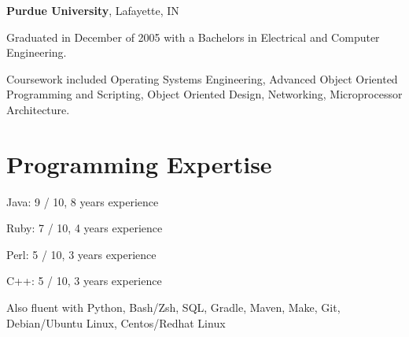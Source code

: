 \documentclass[margin,line]{resume}
\begin{document}
\begin{resume}
	{\bf Purdue University}, Lafayette, IN \vspace{2mm}
	\begin{list2}
		\vspace*{1mm}
	\item
		Graduated in December of 2005 with a Bachelors in Electrical and
		Computer Engineering.
	\item
		Coursework included Operating Systems Engineering, Advanced Object Oriented
		Programming and Scripting, Object Oriented Design, Networking, Microprocessor
		Architecture.
	\end{list2}


	\section{\mysidestyle Programming Expertise} 
	\begin{list2}
	\item 
		Java: 9 / 10, 8 years experience
	\item 
		Ruby: 7 / 10, 4 years experience
	\item
		Perl: 5 / 10, 3 years experience
	\item
		C++: 5 / 10, 3 years experience
	\item
		Also fluent with Python, Bash/Zsh, SQL, Gradle, Maven, Make, Git, Debian/Ubuntu Linux, Centos/Redhat Linux
	\end{list2}


\end{resume}
\end{document}
